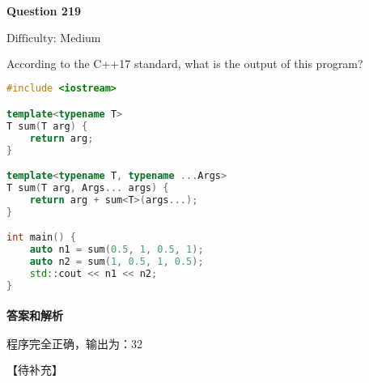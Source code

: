 \documentclass{article}
\begin{document}
	
	\paragraph*{Question 219} $\boxed{\text{Difficulty: Medium}} $			
	
	According to the C++17 standard, what is the output of this program?
	
	\begin{lstlisting}[language=C++]  		
#include <iostream>

template<typename T>
T sum(T arg) {
	return arg;   
}

template<typename T, typename ...Args>
T sum(T arg, Args... args) {    
	return arg + sum<T>(args...);
}

int main() {
	auto n1 = sum(0.5, 1, 0.5, 1);
	auto n2 = sum(1, 0.5, 1, 0.5);
	std::cout << n1 << n2;
}
	\end{lstlisting}
	
	
	\paragraph*{答案和解析} $\boxed{\text{程序完全正确，输出为：32}} $
	
	【待补充】
	
	
\end{document}
